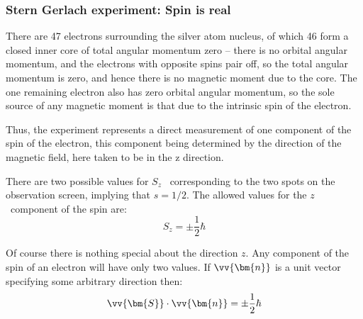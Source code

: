 \begin{frame}
\frametitle{Stern Gerlach experiment: Spin is real}

There are 47 electrons surrounding the silver atom nucleus, of which 46 form a closed inner core of total angular momentum zero -- there is no orbital angular momentum, and the electrons with opposite spins pair off, so the total angular momentum is zero, and hence there is no magnetic moment due to the core. The one remaining electron also has zero orbital angular momentum, \alert{so the sole source of any magnetic moment is that due to the intrinsic spin of the electron.}
 
Thus, the experiment represents a direct measurement of one component of the spin of the electron, this component being determined by the direction of the magnetic field, here taken to be in the z direction.

There are two possible values for $S_z$~ corresponding to the two spots on the observation screen, implying that $s = 1/2$. The allowed values for the $z$~component of the spin are:
\[
S_z = \pm \frac{1}{2}\hbar
\]

Of course there is nothing special about the direction $z$. Any component of the spin of an electron will have only two values. If $\vv{\bm{n}}$ is a unit vector specifying some arbitrary direction then:
\[
\vv{\bm{S}} \cdot \vv{\bm{n}} = \pm \frac{1}{2}\hbar
\]
\end{frame}